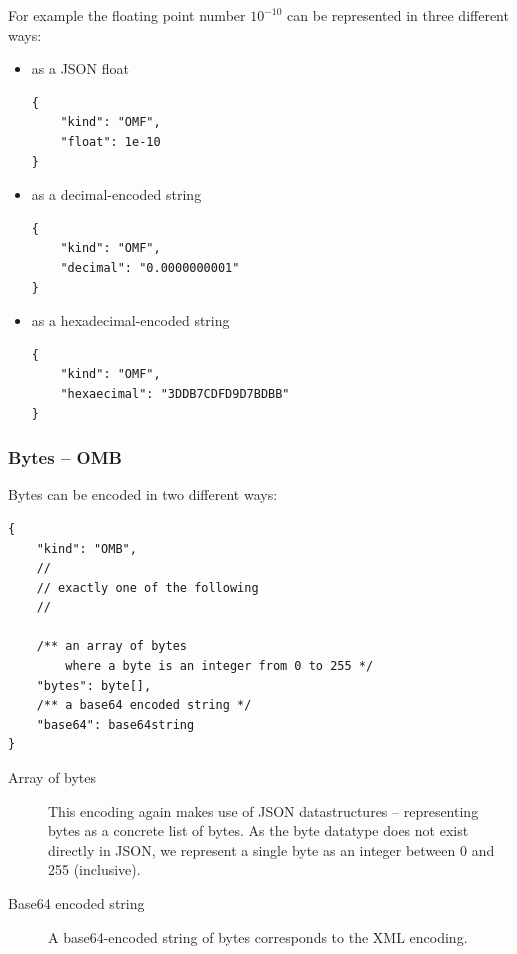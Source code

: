 For example the floating point number $10^{-10}$ can be represented in three different ways:
\begin{itemize}
    \item as a JSON float
\\\begin{minipage}{\linewidth}\begin{lstlisting}
{
    "kind": "OMF",
    "float": 1e-10
}
\end{lstlisting}\end{minipage}
    \item as a decimal-encoded string
\\\begin{minipage}{\linewidth}\begin{lstlisting}
{
    "kind": "OMF",
    "decimal": "0.0000000001"
}
\end{lstlisting}\end{minipage}
    \item as a hexadecimal-encoded string
\\\begin{minipage}{\linewidth}\begin{lstlisting}
{
    "kind": "OMF",
    "hexaecimal": "3DDB7CDFD9D7BDBB"
}
\end{lstlisting}\end{minipage}
\end{itemize}

\subsubsection{Bytes -- OMB}

Bytes can be encoded in two different ways:
\\\begin{minipage}{\linewidth}\begin{lstlisting}
{
    "kind": "OMB",
    //
    // exactly one of the following
    //

    /** an array of bytes
        where a byte is an integer from 0 to 255 */
    "bytes": byte[],
    /** a base64 encoded string */
    "base64": base64string
}
\end{lstlisting}\end{minipage}

\begin{description}
    \item[Array of bytes]
    This encoding again makes use of JSON datastructures -- representing bytes as a concrete list of bytes.
    As the byte datatype does not exist directly in JSON, we represent a single byte as an integer between 0 and 255 (inclusive). 

    \item[Base64 encoded string]
    A base64-encoded string of bytes corresponds to the XML encoding. 
\end{description}

